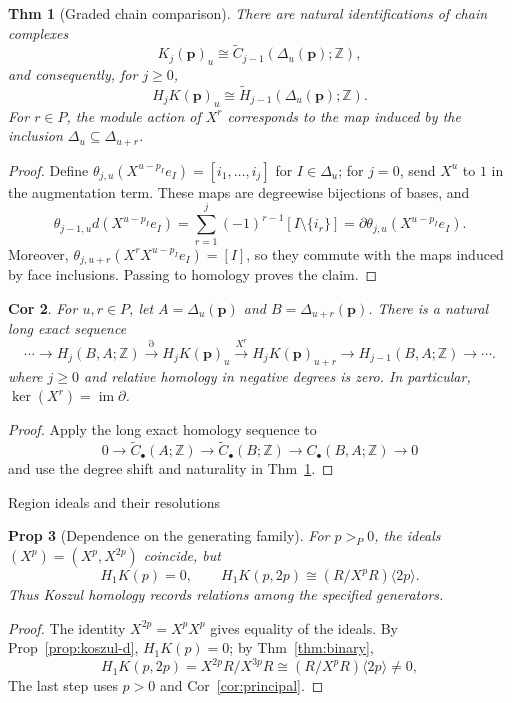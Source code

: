 \documentclass[10pt,letterpaper]{amsart}
\makeatletter
\numberwithin{equation}{section}
\newtheorem{thm}{Thm}[section]
\newtheorem{prop}[thm]{Prop}
\newtheorem{cor}[thm]{Cor}
\theoremstyle{definition}
\newcommand{\Z}{\mathbb Z}
\newcommand{\sh}[1]{\langle #1\rangle}
\def\subsection{\@startsection{subsection}{2}
  \z@{.9\linespacing\@plus.3\linespacing}{.4\linespacing}
  {\normalfont\fontsize{11.5}{14}\selectfont\bfseries\boldmath\raggedright}}
\makeatother
\begin{document}
\begin{thm}[Graded chain comparison]\label{thm:delta}
There are natural identifications of chain complexes
\[
K_j(\mathbf p)_u\cong\widetilde C_{j-1}(\Delta_u(\mathbf p);\Z),
\]
and consequently, for $j\ge0$,
\[
H_jK(\mathbf p)_u\cong\widetilde H_{j-1}(\Delta_u(\mathbf p);\Z).
\]
For $r\in P$, the module action of $X^r$ corresponds to the map induced by the inclusion $\Delta_u\subseteq\Delta_{u+r}$.
\end{thm}
\begin{proof}
Define $\theta_{j,u}(X^{u-p_I}e_I)=[i_1,\ldots,i_j]$ for $I\in\Delta_u$; for $j=0$, send $X^u$ to $1$ in the augmentation term. These maps are degreewise bijections of bases, and
\[
\theta_{j-1,u}d(X^{u-p_I}e_I)
=\sum_{r=1}^j(-1)^{r-1}[I\setminus\{i_r\}]
=\partial\theta_{j,u}(X^{u-p_I}e_I).
\]
Moreover, $\theta_{j,u+r}(X^rX^{u-p_I}e_I)=[I]$, so they commute with the maps induced by face inclusions. Passing to homology proves the claim.
\end{proof}

\begin{cor}\label{cor:relative}
For $u,r\in P$, let $A=\Delta_u(\mathbf p)$ and $B=\Delta_{u+r}(\mathbf p)$. There is a natural long exact sequence
\[
\cdots\to H_j(B,A;\Z)\xrightarrow{\partial}H_jK(\mathbf p)_u
\xrightarrow{X^r}H_jK(\mathbf p)_{u+r}
\to H_{j-1}(B,A;\Z)\to\cdots .
\]
where $j\ge0$ and relative homology in negative degrees is zero. In particular, $\ker(X^r)=\operatorname{im}\partial$.
\end{cor}
\begin{proof}
Apply the long exact homology sequence to
\[
0\to\widetilde C_\bullet(A;\Z)\to\widetilde C_\bullet(B;\Z)
\to C_\bullet(B,A;\Z)\to0
\]
and use the degree shift and naturality in Thm~\ref{thm:delta}.
\end{proof}

\subsection{Region ideals and their resolutions}
\begin{prop}[Dependence on the generating family]\label{prop:redundancy}
For $p>_P0$, the ideals $(X^p)=(X^p,X^{2p})$ coincide, but
\[
H_1K(p)=0,\qquad H_1K(p,2p)\cong(R/X^pR)\sh{2p}.
\]
Thus Koszul homology records relations among the specified generators.
\end{prop}
\begin{proof}
The identity $X^{2p}=X^pX^p$ gives equality of the ideals. By Prop~\ref{prop:koszul-d}, $H_1K(p)=0$; by Thm~\ref{thm:binary},
\[
H_1K(p,2p)=X^{2p}R/X^{3p}R\cong(R/X^pR)\sh{2p}\ne0,
\]
The last step uses $p>0$ and Cor~\ref{cor:principal}.
\end{proof}
\end{document}
